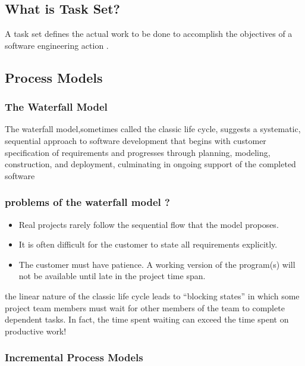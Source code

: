 \documentclass[12pt]{article}
\begin{document}
\subsection{What is Task Set?}

A task set defines the actual work to be done
to accomplish the objectives of a software
engineering action .




\subsection{Process Models}

\subsubsection{The Waterfall Model}

The waterfall model,sometimes called the classic life cycle, suggests a systematic,
sequential approach to software development that begins with customer specification of requirements and progresses through planning, modeling, construction, and deployment, culminating in ongoing support of the completed software

\subsubsection{problems of the waterfall model ?}


\begin{itemize}
	\item Real projects rarely follow the sequential flow that the model proposes.
	\item It is often difficult for the customer to state all requirements explicitly.
	\item The customer must have patience. A working version of the program(s) will
not be available until late in the project time span.
\end{itemize}



the linear
nature of the classic life cycle leads to “blocking states” in which some project team
members must wait for other members of the team to complete dependent tasks. In
fact, the time spent waiting can exceed the time spent on productive work!



\subsubsection{Incremental Process Models}
\end{document}
